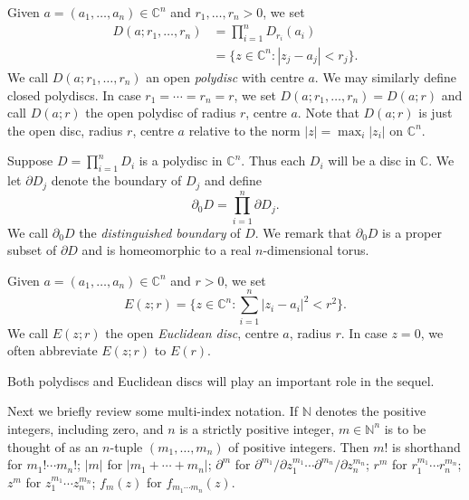 Given $a=(a_1,\ldots,a_n)\in\mathbb C^n$ and $r_1,\ldots,r_n>0$, we set
\begin{align*}
D(a;r_1,\ldots,r_n)&=\prod_{i=1}^n D_{r_i}(a_i)\\
&=\{z\in\mathbb C^n:|z_j-a_j|<r_j\}.
\end{align*}
We call $D(a;r_1,\ldots,r_n)$ an open \emph{polydisc} with centre $a$. We may similarly define closed polydiscs. In case $r_1=\cdots=r_n=r$, we set $D(a;r_1,\ldots,r_n)=D(a;r)$ and call $D(a;r)$ the open polydisc of radius $r$, centre $a$. Note that $D(a;r)$ is just the open disc, radius $r$, centre $a$ relative to the norm $|z|=\max_i|z_i|$ on $\mathbb C^n$.

Suppose $D=\prod_{i=1}^n D_i$ is a polydisc in $\mathbb C^n$. Thus each $D_i$ will be a disc in $\mathbb C$. We let $\partial D_j$ denote the boundary of $D_j$ and define
\[\partial_0D=\prod_{i=1}^n\partial D_j.\]
We call $\partial_0D$ the \emph{distinguished boundary} of $D$. We remark that $\partial_0D$ is a proper subset of $\partial D$ and is homeomorphic to a real $n$-dimensional torus.

Given $a=(a_1,\ldots,a_n)\in\mathbb C^n$ and $r>0$, we set
\[E(z;r)=\{z\in\mathbb C^n:\sum_{i=1}^n|z_i-a_i|^2<r^2\}.\]
We call $E(z;r)$ the open \emph{Euclidean disc}, centre $a$, radius $r$. In case $z=0$, we often abbreviate $E(z;r)$ to $E(r)$.

Both polydiscs and Euclidean discs will play an important role in the sequel.

Next we briefly review some multi-index notation. If $\mathbb N$ denotes the positive integers, including zero, and $n$ is a strictly positive
integer, $m\in\mathbb N^n$ is to be thought of as an $n$-tuple $(m_1,\ldots,m_n)$ of positive integers. Then $m!$ is shorthand for $m_1!\cdots m_n!$; $|m|$ for $|m_1+\cdots+m_n|$; $\partial^m$ for $\partial^{m_1}/\partial z_1^{m_1}\cdots\partial^{m_n}/\partial z_n^{m_n}$; $r^m$ for $r_1^{m_1}\cdots r_n^{m_n}$; $z^m$ for $z_1^{m_1}\cdots z_n^{m_n}$; $f_m(z)$ for $f_{m_1\cdots m_n}(z)$.

